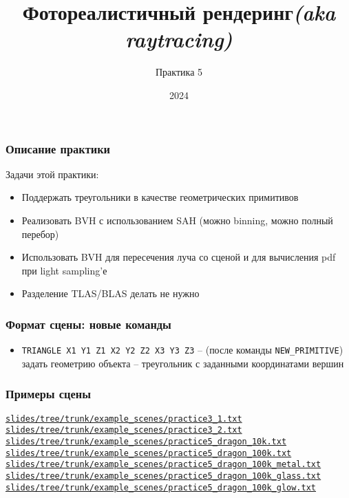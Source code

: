 \documentclass[10pt,handout]{beamer}
\title{Фотореалистичный рендеринг\quad\quad\quad\quad\quad\quad \textit{(aka raytracing)}}
\subtitle{Практика 5}
\date{2024}
\begin{document}
\frame{\titlepage}

\begin{frame}[fragile]
\frametitle{Описание практики}
Задачи этой практики:
\begin{itemize}
\item Поддержать треугольники в качестве геометрических примитивов
\item Реализовать BVH с использованием SAH (можно binning, можно полный перебор)
\item Использовать BVH для пересечения луча со сценой и для вычисления pdf при light sampling'е
\item Разделение TLAS/BLAS делать не нужно
\end{itemize}
\end{frame}

\begin{frame}
\frametitle{Формат сцены: новые команды}
\begin{itemize}
\item \texttt{TRIANGLE X1 Y1 Z1 X2 Y2 Z2 X3 Y3 Z3} -- (после команды \texttt{NEW\_PRIMITIVE}) задать геометрию объекта -- треугольник с заданными координатами вершин
\end{itemize}
\end{frame}

\begin{frame}[fragile]
\frametitle{Примеры сцены}
\begin{scriptsize}
\href{https://github.com/lisyarus/raytracing-course-slides/tree/trunk/example_scenes/practice5_1.txt}{\texttt{slides/tree/trunk/example\_scenes/practice3\_1.txt}}
\href{https://github.com/lisyarus/raytracing-course-slides/tree/trunk/example_scenes/practice5_2.txt}{\texttt{slides/tree/trunk/example\_scenes/practice3\_2.txt}}
\href{https://github.com/lisyarus/raytracing-course-slides/tree/trunk/example_scenes/practice5_dragon_10k.txt}{\texttt{slides/tree/trunk/example\_scenes/practice5\_dragon\_10k.txt}}
\href{https://github.com/lisyarus/raytracing-course-slides/tree/trunk/example_scenes/practice5_dragon_100k.txt}{\texttt{slides/tree/trunk/example\_scenes/practice5\_dragon\_100k.txt}}
\href{https://github.com/lisyarus/raytracing-course-slides/tree/trunk/example_scenes/practice5_dragon_100k_metal.txt}{\texttt{slides/tree/trunk/example\_scenes/practice5\_dragon\_100k\_metal.txt}}
\href{https://github.com/lisyarus/raytracing-course-slides/tree/trunk/example_scenes/practice5_dragon_100k_glass.txt}{\texttt{slides/tree/trunk/example\_scenes/practice5\_dragon\_100k\_glass.txt}}
\href{https://github.com/lisyarus/raytracing-course-slides/tree/trunk/example_scenes/practice5_dragon_100k_glow.txt}{\texttt{slides/tree/trunk/example\_scenes/practice5\_dragon\_100k\_glow.txt}}
\end{scriptsize}
\end{frame}
\end{document}
